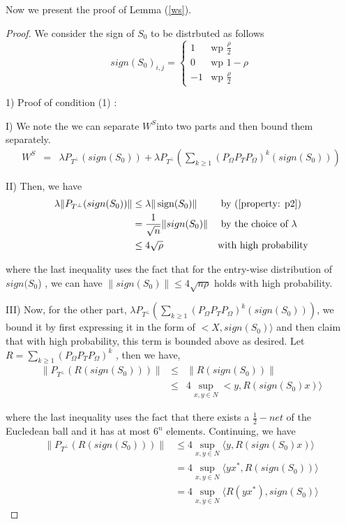 Now we present the proof of Lemma (\ref{ws}).
\begin{proof}
We consider the sign of $S_{0}$ to be distrbuted as follows
\[
sign(S_{0})_{i,j}=\begin{cases}
1 & \text{wp }\frac{\rho}{2}\\
0 & \text{wp }1-\rho\\
-1 & \text{wp }\frac{\rho}{2}
\end{cases}
\]


1) Proof of condition (1) :

I) We note the we can separate $W^{S}$into two parts and then bound them separately.
%
\begin{eqnarray*}
W^{S} & = & \lambda P_{T^{\bot}}(sign(S_{0}))+\lambda P_{T^{\bot}}(\sum_{k\ge1}(P_{\Omega}P_{T}P_{\Omega})^{k}(sign(S_{0})))
\end{eqnarray*}


II) Then, we have
\begin{align*}
\lambda \| P_{T^{\bot}}(sign(S_{0})) \|
& \le \lambda\| \operatorname{sign}(S_{0}) \|  &&\text{ by (\ref{property: p2})}\\
& = \frac{1}{\sqrt{n}}\|sign(S_{0})\| &&\text{ by the choice of }  \lambda\\
& \le 4\sqrt{\rho} &&\text{with high probability}
\end{align*}


where the last inequality uses the fact that for the entry-wise distribution of $sign(S_{0}$) , we can have $\|sign(S_{0})\|\le4\sqrt{n\rho}$ holds with high probability.

III) Now, for the other part, $\lambda P_{T^{\bot}}(\sum_{k\ge1}(P_{\Omega}P_{T}P_{\Omega})^{k}(sign(S_{0})))$, we bound it by first expressing it in the form of $<X,sign(S_{0})\rangle$ and then claim that with high probability, this term is bounded above as desired. Let $R=\sum_{k\ge1}(P_{\Omega}P_{T}P_{\Omega})^{k}$ ,
then we have,
\begin{eqnarray*}
\|P_{T^{\bot}}(R(sign(S_{0})))\| & \le & \|R(sign(S_{0}))\|\\
 & \le & 4\sup_{x,y\in N}<y,R(sign(S_{0})x)\rangle
\end{eqnarray*}


where the last inequality uses the fact that there exists a $\frac{1}{2}-net$ of the Eucledean ball and it has at most $6^{n}$ elements. Continuing, we have
\begin{align}
\|P_{T^{\bot}}(R(sign(S_{0})))\|
& \le 4\sup_{x,y \in N} \langle y,R(sign(S_{0})x) \rangle \nonumber \\
& = 4\sup_{x,y \in N} \langle yx^{*},R(sign(S_{0})) \rangle \nonumber \\
& = 4\sup_{x,y \in N} \langle R(yx^{*}),sign(S_{0}) \rangle
\label{net}
\end{align}



\end{proof}

